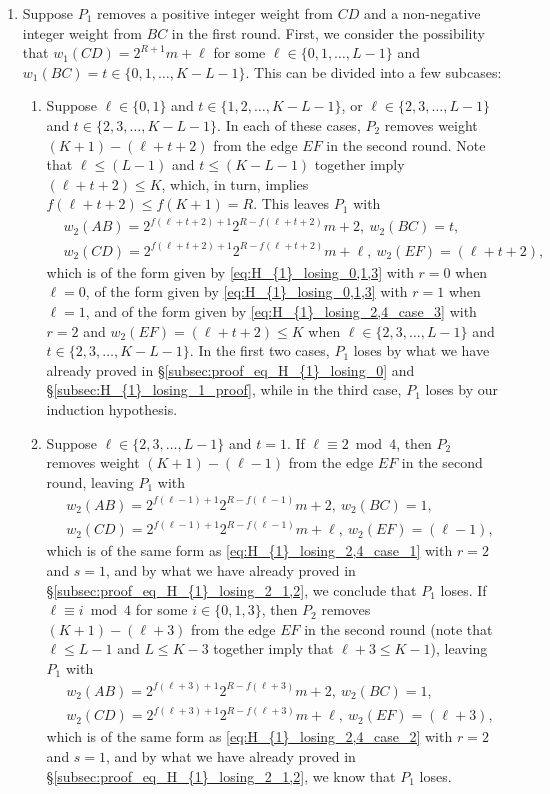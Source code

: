 \documentclass[11pt,reqno]{amsart}
\theoremstyle{definition}
\theoremstyle{definition}
\begin{document}
\begin{enumerate}
\item Suppose $P_{1}$ removes a positive integer weight from $CD$ and a non-negative integer weight from $BC$ in the first round. First, we consider the possibility that $w_{1}(CD)=2^{R+1}m+\ell$ for some $\ell \in \{0,1,\ldots,L-1\}$ and $w_{1}(BC)=t\in \{0,1,\ldots,K-L-1\}$. This can be divided into a few subcases:
\begin{enumerate}
\item Suppose $\ell \in \{0,1\}$ and $t \in \{1,2,\ldots,K-L-1\}$, or $\ell \in \{2,3,\ldots,L-1\}$ and $t \in \{2,3,\ldots,K-L-1\}$. In each of these cases, $P_{2}$ removes weight $(K+1)-(\ell+t+2)$ from the edge $EF$ in the second round. Note that $\ell\leqslant (L-1)$ and $t \leqslant (K-L-1)$ together imply $(\ell+t+2)\leqslant K$, which, in turn, implies $f(\ell+t+2)\leqslant f(K+1)=R$. This leaves $P_{1}$ with
\begin{align}
{}&w_{2}(AB)=2^{f(\ell+t+2)+1}2^{R-f(\ell+t+2)}m+2,\ w_{2}(BC)=t,\nonumber\\
{}&w_{2}(CD)=2^{f(\ell+t+2)+1}2^{R-f(\ell+t+2)}m+\ell,\ w_{2}(EF)=(\ell+t+2),\nonumber
\end{align}
which is of the form given by \eqref{eq:H_{1}_losing_0,1,3} with $r=0$ when $\ell=0$, of the form given by \eqref{eq:H_{1}_losing_0,1,3} with $r=1$ when $\ell=1$, and of the form given by \eqref{eq:H_{1}_losing_2,4_case_3} with $r=2$ and $w_{2}(EF)=(\ell+t+2)\leqslant K$ when $\ell \in \{2,3,\ldots,L-1\}$ and $t \in \{2,3,\ldots,K-L-1\}$. In the first two cases, $P_{1}$ loses by what we have already proved in \S\ref{subsec:proof_eq_H_{1}_losing_0} and \S\ref{subsec:H_{1}_losing_1_proof}, while in the third case, $P_{1}$ loses by our induction hypothesis.

\item Suppose $\ell \in \{2,3,\ldots,L-1\}$ and $t=1$. If $\ell \equiv 2 \bmod 4$, then $P_{2}$ removes weight $(K+1)-(\ell-1)$ from the edge $EF$ in the second round, leaving $P_{1}$ with
\begin{align}
{}&w_{2}(AB)=2^{f(\ell-1)+1}2^{R-f(\ell-1)}m+2,\ w_{2}(BC)=1,\nonumber\\
{}&w_{2}(CD)=2^{f(\ell-1)+1}2^{R-f(\ell-1)}m+\ell,\ w_{2}(EF)=(\ell-1),\nonumber
\end{align}
which is of the same form as \eqref{eq:H_{1}_losing_2,4_case_1} with $r=2$ and $s=1$, and by what we have already proved in \S\ref{subsec:proof_eq_H_{1}_losing_2_1,2}, we conclude that $P_{1}$ loses. If $\ell \equiv i \bmod 4$ for some $i \in \{0,1,3\}$, then $P_{2}$ removes $(K+1)-(\ell+3)$ from the edge $EF$ in the second round (note that $\ell \leqslant L-1$ and $L \leqslant K-3$ together imply that $\ell+3\leqslant K-1$), leaving $P_{1}$ with
\begin{align}
{}&w_{2}(AB)=2^{f(\ell+3)+1}2^{R-f(\ell+3)}m+2,\ w_{2}(BC)=1,\nonumber\\
{}&w_{2}(CD)=2^{f(\ell+3)+1}2^{R-f(\ell+3)}m+\ell,\ w_{2}(EF)=(\ell+3),\nonumber
\end{align}
which is of the same form as \eqref{eq:H_{1}_losing_2,4_case_2} with $r=2$ and $s=1$, and by what we have already proved in \S\ref{subsec:proof_eq_H_{1}_losing_2_1,2}, we know that $P_{1}$ loses. 


\end{enumerate}
\end{enumerate}
\end{document}

